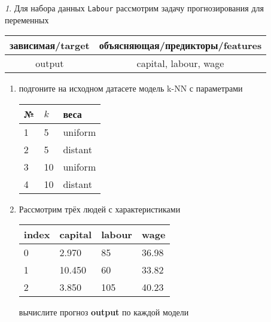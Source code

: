 \documentclass[12pt]{article}
\theoremstyle{remark}
\newtheorem{exercise}{}[section]
\begin{document}
\begin{exercise}
Для набора данных \texttt{Labour} рассмотрим задачу прогнозирования
для переменных
\begin{center}
	\begin{tabular}{|c|c|}\hline
		зависимая/target & объясняющая/предикторы/features \\ \hline
		output & capital, labour, wage \\ \hline
	\end{tabular}
\end{center}
\begin{enumerate}
	\item подгоните на исходном датасете модель k-NN с параметрами
	\begin{center}
		\begin{tabular}{|l|l|l|}\hline
		№ & \(k\) & веса \\ \hline
		1 & 5 & uniform \\
		2 & 5 & distant \\
		3 & 10 & uniform \\
		4 & 10 & distant \\ \hline
		\end{tabular}
	\end{center}
	\item Рассмотрим трёх людей с характеристиками
	\begin{center}
		\begin{tabular}{|l||l|l|l|}\hline
			index & capital & labour & wage \\ \hline\hline
			0 & 2.970 & 85 & 36.98\\
			1 & 10.450 & 60 & 33.82  \\
			2 & 3.850 & 105 & 40.23\\ \hline
		\end{tabular}
	\end{center}
	вычислите прогноз \textbf{output} по каждой модели
\end{enumerate}
\end{exercise}
\end{document}
